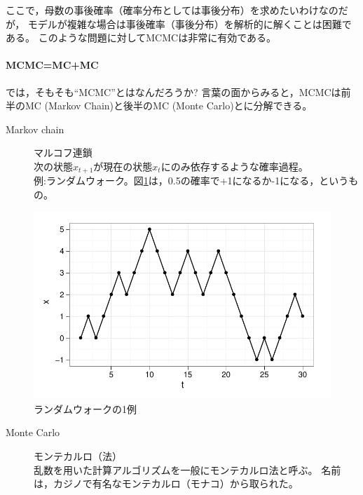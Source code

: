 \documentclass[11pt,uplatex]{jsarticle}
\begin{document}
ここで，母数の事後確率（確率分布としては事後分布）を求めたいわけなのだが，
モデルが複雑な場合は事後確率（事後分布）を解析的に解くことは困難である。
このような問題に対してMCMCは非常に有効である。


\paragraph{MCMC=MC+MC}

では，そもそも``MCMC''とはなんだろうか?
言葉の面からみると，MCMCは前半のMC (Markov Chain)と後半のMC (Monte Carlo)とに分解できる。

\begin{description}
\item[Markov chain] マルコフ連鎖\\
次の状態$x_{t+1}$が現在の状態$x_{t}$にのみ依存するような確率過程。\\
例:ランダムウォーク。図\ref{random_walk_plot}は，0.5の確率で+1になるか-1になる，というもの。
\end{description}

\begin{figure}[hbtp]
  \begin{center}
    \includegraphics[bb=0 0 380 240, clip, width=300 bp]{random_walk2.pdf}
  \end{center}
  \caption{ランダムウォークの1例}
  \label{random_walk_plot}
\end{figure}

\begin{description}
\item[Monte Carlo] モンテカルロ（法）\\
乱数を用いた計算アルゴリズムを一般にモンテカルロ法と呼ぶ。
名前は，カジノで有名なモンテカルロ（モナコ）から取られた。
\end{description}
\end{document}
